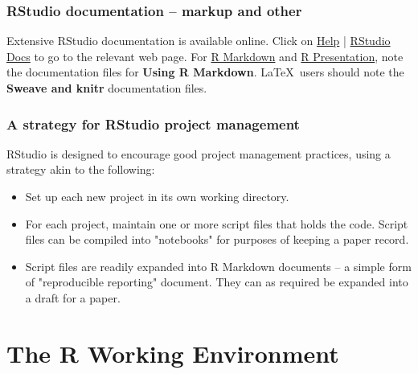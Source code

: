 \documentclass{tufte-book}\usepackage[]{graphicx}\usepackage[]{color}
\begin{document}
\subsection{RStudio documentation -- markup and other}

Extensive RStudio documentation is available online.  Click on
\underline{Help} | \underline{RStudio Docs} to go to the relevant web
page. For \underline{R Markdown} and \underline{R Presentation}, note
the documentation files for {\bf Using R Markdown}.  \LaTeX\ users
should note the {\bf Sweave and knitr} documentation files.

\subsection{A strategy for RStudio project management}

RStudio is designed to encourage good project management practices,
using a strategy akin to the following:
\begin{itemize}
\item[] Set up each new project in its own working directory.
\item[] For each project, maintain one or more script files that
holds the code.  Script files can be compiled into "notebooks"
for purposes of keeping a paper record.
\item[] Script files are readily expanded into R Markdown documents
-- a simple form of "reproducible reporting" document.  They can
as required be expanded into a draft for a paper.
\end{itemize}

\chapter{The R Working Environment}\label{ch:workenv}





\end{document}
